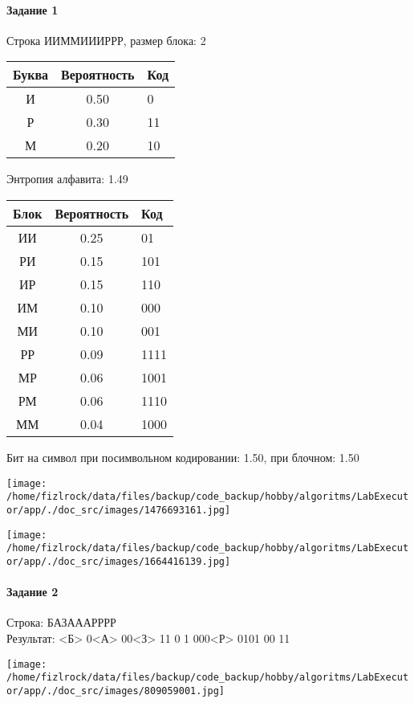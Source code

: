 \documentclass[a4paper, 12pt]{article}
\begin{document}
\paragraph{Задание 1}

Строка ИИММИИИРРР, размер блока: 2
\begin{center}
 \begin{tabular}{ |c|c|l| } 
  \hline
     Буква & Вероятность & Код\\ \hline
И & 0.50 & 0\\\hline
Р & 0.30 & 11\\\hline
М & 0.20 & 10
\\ \hline \end{tabular}
\end{center}
Энтропия алфавита: 1.49
\begin{center}
 \begin{tabular}{ |c|c|l| } 
  \hline
     Блок & Вероятность & Код\\ \hline
ИИ & 0.25 & 01\\\hline
РИ & 0.15 & 101\\\hline
ИР & 0.15 & 110\\\hline
ИМ & 0.10 & 000\\\hline
МИ & 0.10 & 001\\\hline
РР & 0.09 & 1111\\\hline
МР & 0.06 & 1001\\\hline
РМ & 0.06 & 1110\\\hline
ММ & 0.04 & 1000
\\ \hline \end{tabular}
\end{center}
Бит на символ при посимвольном кодировании: 1.50, при блочном: 1.50

\texttt{[image: /home/fizlrock/data/files/backup/code\_backup/hobby/algoritms/LabExecutor/app/./doc\_src/images/1476693161.jpg]}

\texttt{[image: /home/fizlrock/data/files/backup/code\_backup/hobby/algoritms/LabExecutor/app/./doc\_src/images/1664416139.jpg]}
\pagebreak
\paragraph{Задание 2}

Строка: 
БАЗАААРРРР\\
Результат: <Б> 0<А> 00<З> 11 0 1 000<Р> 0101 00 11

\texttt{[image: /home/fizlrock/data/files/backup/code\_backup/hobby/algoritms/LabExecutor/app/./doc\_src/images/809059001.jpg]}
\end{document}
